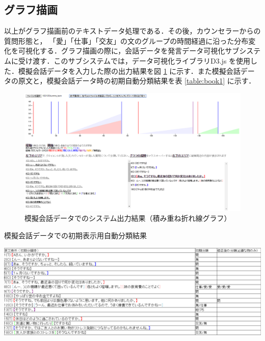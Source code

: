 \documentclass[shuuron]{kuee}
\begin{document}
\subsection{グラフ描画}
以上がグラフ描画前のテキストデータ処理である．その後，カウンセラーからの質問形態と， 「愛」「仕事」「交友」の文のグループの時間経過に沿った分布変化を可視化する．グラフ描画の際に，会話データを発言データ可視化サブシステムに受け渡す．このサブシステムでは，データ可視化ライブラリD3.js
\cite{bostock2012d3}
を使用した．模擬会話データを入力した際の出力結果を図
 \ref{fig:6_1}
に示す．また模擬会話データの原文と，模擬会話データ時の初期自動分類結果を表
 \ref{table:book1}
に示す．
\begin{figure}
   \begin{center}
     \includegraphics[width=\linewidth]{6_1.png}
   \end{center}
   \caption{模擬会話データでのシステム出力結果（積み重ね折れ線グラフ）}
   \label{fig:6_1}
 \end{figure}

\begin{table}
   \caption{模擬会話データでの初期表示用自動分類結果}
   \label{table:book1}
   \begin{center}
     \includegraphics[width=\linewidth]{book1.png}
   \end{center}
 \end{table}
\end{document}
